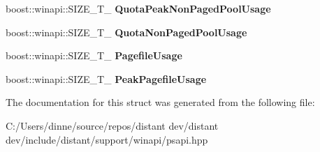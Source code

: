 \begin{DoxyCompactItemize}
boost\+::winapi\+::\+S\+I\+Z\+E\+\_\+\+T\+\_\+ {\bfseries Quota\+Peak\+Non\+Paged\+Pool\+Usage}
\item 
\mbox{\label{structboost_1_1winapi_1_1___p_r_o_c_e_s_s___m_e_m_o_r_y___c_o_u_n_t_e_r_s___a4a011a1d557099106244de1fd95f6c8b}} 
boost\+::winapi\+::\+S\+I\+Z\+E\+\_\+\+T\+\_\+ {\bfseries Quota\+Non\+Paged\+Pool\+Usage}
\item 
\mbox{\label{structboost_1_1winapi_1_1___p_r_o_c_e_s_s___m_e_m_o_r_y___c_o_u_n_t_e_r_s___a23d775a87f37710f1e678cd42b73410a}} 
boost\+::winapi\+::\+S\+I\+Z\+E\+\_\+\+T\+\_\+ {\bfseries Pagefile\+Usage}
\item 
\mbox{\label{structboost_1_1winapi_1_1___p_r_o_c_e_s_s___m_e_m_o_r_y___c_o_u_n_t_e_r_s___a5e1a3648f6d52bab1065f72eb2503aee}} 
boost\+::winapi\+::\+S\+I\+Z\+E\+\_\+\+T\+\_\+ {\bfseries Peak\+Pagefile\+Usage}
\end{DoxyCompactItemize}


The documentation for this struct was generated from the following file\+:\begin{DoxyCompactItemize}
\item 
C\+:/\+Users/dinne/source/repos/distant dev/distant dev/include/distant/support/winapi/psapi.\+hpp\end{DoxyCompactItemize}
